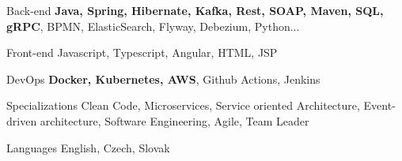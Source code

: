 

\begin{cvskills}

  \cvskill
  {Back-end} %
  {\textbf{Java, Spring, Hibernate, Kafka, Rest, SOAP, Maven, SQL, gRPC}, BPMN, ElasticSearch, Flyway, Debezium, Python...} %

  \cvskill
  {Front-end} %
  {Javascript, Typescript, Angular, HTML, JSP} %

  \cvskill
  {DevOps} %
  {\textbf{Docker, Kubernetes, AWS}, Github Actions, Jenkins} %

  \cvskill
  {Specializations} %
  {Clean Code, Microservices, Service oriented Architecture, Event-driven architecture, Software Engineering, Agile,
    Team Leader} %

  \cvskill
  {Languages} %
  {English, Czech, Slovak} %

\end{cvskills}
